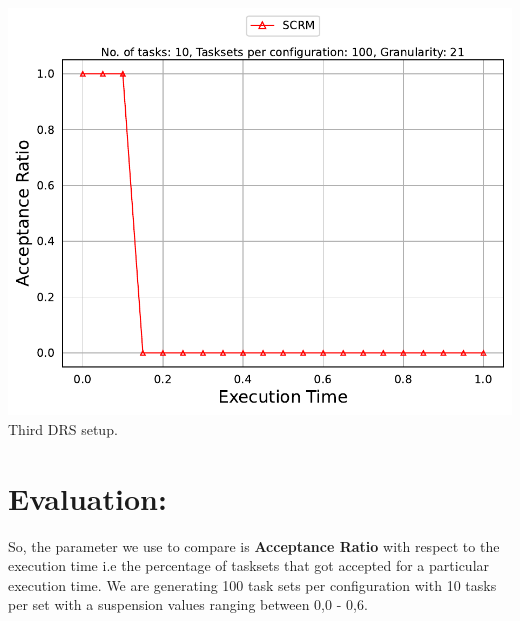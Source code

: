 \documentclass[]{article}
\begin{document}
\begin{minipage}[t]{0.48\linewidth}
            \includegraphics[width=\linewidth]{SCRM_3rd Setup.pdf}
		Third DRS setup.
		\vspace{0.3cm}


                   

	\end{minipage}

        
        

        
\section*{Evaluation:}      

{
\raggedleft \newline

So, the parameter we use to compare is \textbf{Acceptance Ratio} with respect to the execution time i.e the percentage of tasksets that got accepted for a particular execution time. We are generating 100 task sets per configuration with 10 tasks per set with a suspension values ranging between 0,0 - 0,6. \newline
}
\end{document}
